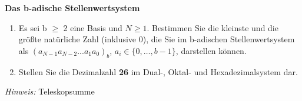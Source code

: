 \textbf{Das b-adische Stellenwertsystem}
\begin{enumerate}
	\item Es sei b $\geq$ 2 eine Basis und $N \geq 1$. Bestimmen Sie die kleinste und die größte natürliche Zahl (inklusive 0), die Sie im b-adischen Stellenwertsystem als $(a_{N-1} a_{N-2} ...a_1 a_0)_b$, $a_i \in \lbrace 0, \dots, b-1\rbrace$, darstellen können.
	\item Stellen Sie die Dezimalzahl \textbf{26} im Dual-, Oktal- und Hexadezimalsystem dar.
\end{enumerate}
\textit{Hinweis:} Teleskopsumme
